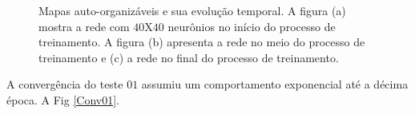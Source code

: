 \begin{figure}[H]
	\centering
	\qquad
	\qquad
	\qquad
	\caption{Mapas auto-organizáveis e sua evolução temporal. A figura (a) mostra a rede com $40$X$40$ neurônios no início do processo de treinamento. A figura (b) apresenta a rede no meio do processo de treinamento e (c) a rede no final do processo de treinamento.}
	\label{SOMt01}
\end{figure}

A convergência do teste $01$ assumiu um comportamento exponencial até a décima época. A Fig \ref{Conv01}. 


